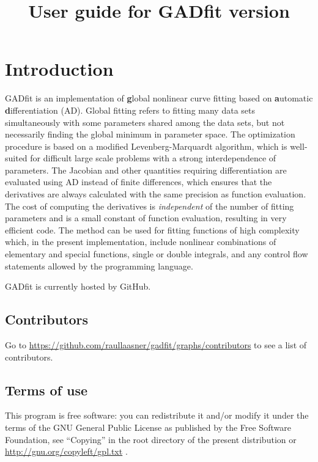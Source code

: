 \documentclass{article}
\title{User guide for GADfit version \version}
\date{\monthname {} \the\year}
\begin{document}
\maketitle
\tableofcontents

\section{Introduction}

GADfit is an implementation of \textbf{g}lobal nonlinear curve fitting based on \textbf{a}utomatic \textbf{d}ifferentiation (AD). Global fitting refers to fitting many data sets simultaneously with some parameters shared among the data sets, but not necessarily finding the global minimum in parameter space. The optimization procedure is based on a modified Levenberg-Marquardt algorithm, which is well-suited for difficult large scale problems with a strong interdependence of parameters. The Jacobian and other quantities requiring differentiation are evaluated using AD instead of finite differences, which ensures that the derivatives are always calculated with the same precision as function evaluation. The cost of computing the derivatives is \textit{independent} of the number of fitting parameters and is a small constant of function evaluation, resulting in very efficient code. The method can be used for fitting functions of high complexity which, in the present implementation, include nonlinear combinations of elementary and special functions, single or double integrals, and any control flow statements allowed by the programming language.

GADfit is currently hosted by GitHub.

\subsection{Contributors}

Go to \url{https://github.com/raullaasner/gadfit/graphs/contributors} to see a list of contributors.

\subsection{Terms of use}

This program is free software: you can redistribute it and/or modify it under the terms of the GNU General Public License as published by the Free Software Foundation, see ``Copying'' in the root directory of the present distribution or \url{http://gnu.org/copyleft/gpl.txt} .
\end{document}
